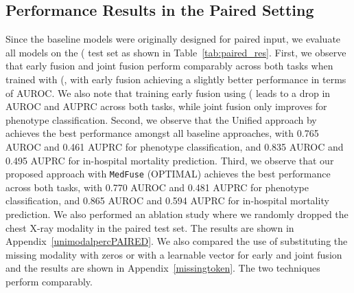 \documentclass[pmlr]{jmlr}
\begin{document}
\subsection{Performance Results in the Paired Setting}
Since the baseline models were originally designed for paired input, we evaluate all models on the ( test set as shown in Table~\ref{tab:paired_res}. First, we observe that early fusion and joint fusion perform comparably across both tasks when trained with (, with early fusion achieving a slightly better performance in terms of AUROC. We also note that training early fusion using ( leads to a drop in AUROC and AUPRC across both tasks, while joint fusion only improves for phenotype classification. Second, we observe that the Unified approach by \cite{hayat2021dynamic} achieves the best performance amongst all baseline approaches, with 0.765 AUROC and 0.461 AUPRC for phenotype classification, and 0.835 AUROC and 0.495 AUPRC for in-hospital mortality prediction. Third, we observe that our proposed approach with \texttt{MedFuse} (OPTIMAL) achieves the best performance across both tasks, with 0.770 AUROC and 0.481 AUPRC for phenotype classification, and 0.865 AUROC and 0.594 AUPRC for in-hospital mortality prediction. We also performed an ablation study where we randomly dropped the chest X-ray modality in the paired test set. The results are shown in Appendix~\ref{unimodalpercPAIRED}. We also compared the use of substituting the missing modality with zeros or with a learnable vector for early and joint fusion and the results are shown in Appendix~\ref{missingtoken}. The two techniques perform comparably. 
\end{document}
